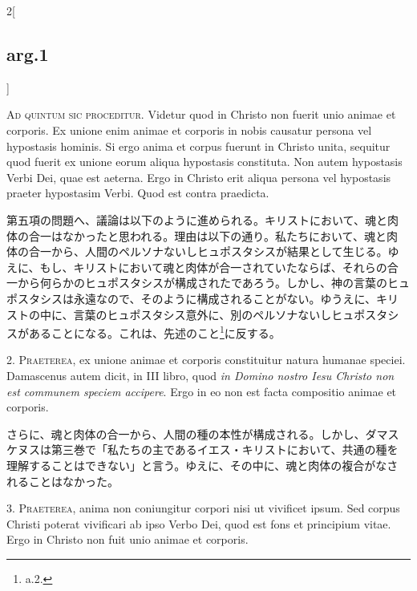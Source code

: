 \documentclass[paper=a4paper,fontsize=10pt,jafontsize=9pt,titlepage]{jlreq}
\begin{document}
\begin{paracol}{2}[\subsection{arg.1}]

{\Huge A}{\scshape d quintum sic proceditur}. Videtur quod in Christo
non fuerit unio animae et corporis. Ex unione enim animae et corporis
in nobis causatur persona vel hypostasis hominis. Si ergo anima et
corpus fuerunt in Christo unita, sequitur quod fuerit ex unione eorum
aliqua hypostasis constituta. Non autem hypostasis Verbi Dei, quae est
aeterna. Ergo in Christo erit aliqua persona vel hypostasis praeter
hypostasim Verbi. Quod est contra praedicta.

\switchcolumn

第五項の問題へ、議論は以下のように進められる。キリストにおいて、魂と肉
体の合一はなかったと思われる。理由は以下の通り。私たちにおいて、魂と肉
体の合一から、人間のペルソナないしヒュポスタシスが結果として生じる。ゆ
えに、もし、キリストにおいて魂と肉体が合一されていたならば、それらの合
一から何らかのヒュポスタシスが構成されたであろう。しかし、神の言葉のヒュ
ポスタシスは永遠なので、そのように構成されることがない。ゆうえに、キリ
ストの中に、言葉のヒュポスタシス意外に、別のペルソナないしヒュポスタシ
スがあることになる。これは、先述のこと\footnote{a.2.}に反する。


2. {\scshape Praeterea}, ex unione animae et corporis constituitur
natura humanae speciei. Damascenus autem dicit, in III libro, quod
{\itshape in Domino nostro Iesu Christo non est communem speciem
accipere}. Ergo in eo non est facta compositio animae et corporis.

\switchcolumn

さらに、魂と肉体の合一から、人間の種の本性が構成される。しかし、ダマス
ケヌスは第三巻で「私たちの主であるイエス・キリストにおいて、共通の種を
理解することはできない」と言う。ゆえに、その中に、魂と肉体の複合がなさ
れることはなかった。


3. {\scshape Praeterea}, anima non coniungitur corpori nisi ut
vivificet ipsum. Sed corpus Christi poterat vivificari ab ipso Verbo
Dei, quod est fons et principium vitae. Ergo in Christo non fuit unio
animae et corporis.


\end{paracol}
\end{document}

